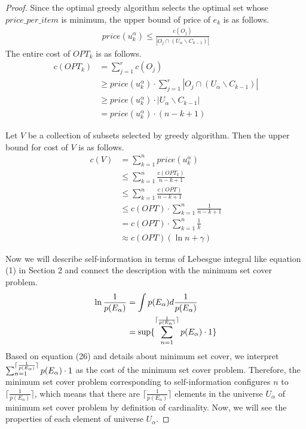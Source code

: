 \begin{proof}
Since the optimal greedy algorithm selects the optimal set whose $price\_per\_item$ is minimum,
the upper bound of price of $e_k$ is as follows.  
\begin{align}
\label{up_bound_price_per_item}
price(u^{\alpha}_k) \le \frac{c(O_j)}{|O_j \cap (U_{\alpha} \backslash C_{k-1})|} 
\end{align}
The entire cost of $OPT_k$ is as follows.
\begin{equation}
\label{low_bound_cost_optimum}
\begin{split}
c(OPT_k) &= \sum_{j=1}^rc(O_j)\\
         &\ge price(u^{\alpha}_k) \cdot \sum_{j=1}^r|O_j \cap (U_{\alpha}\backslash C_{k-1})|\\
         &\ge price(u^{\alpha}_k) \cdot |U_{\alpha} \backslash C_{k-1}|\\
         &= price(u^{\alpha}_k) \cdot (n-k+1)
\end{split}
\end{equation}

Let $V$ be a collection of subsets selected by greedy algorithm. 
Then the upper bound for cost of $V$ is as follows.
\begin{equation}
\label{up_bound_cost}
\begin{split}
c(V) &= \sum_{k=1}^n price(u^{\alpha}_k) \\
     &\le \sum_{k=1}^n\frac{c(OPT_k)}{n-k+1} \\
     &\le \sum_{k=1}^n\frac{c(OPT)}{n-k+1} \\
     &\le c(OPT) \cdot \sum_{k=1}^n \frac{1}{n-k+1} \\
     &= c(OPT) \cdot \sum_{k=1}^n \frac{1}{k} \\
     &\approx c(OPT)(\ln n + \gamma)
\end{split}
\end{equation} 

Now we will describe self-information in terms of Lebesgue integral like equation (1) in Section 2 
and connect the description with the minimum set cover problem.
\begin{align}
\label{lebesgue_integral_entropy}
\begin{split}
\ln {1 \over p(E_\alpha)} &=\int p(E_\alpha)d{1 \over p(E_\alpha)}\\
                          &=\sup\{\sum_{n=1}^{\lceil{1 \over p(E_{\alpha})}\rceil}p(E_{\alpha}) \cdot 1\}\\  
\end{split}
\end{align}
Based on equation (26) and details about minimum set cover, 
we interpret $\sum_{n=1}^{\lceil{1 \over p(E_\alpha)}\rceil}p(E_\alpha)\cdot 1$ as the cost of the minimum set cover problem.
Therefore, the minimum set cover problem corresponding to self-information configures $n$ to $\lceil\frac{1}{p(E_{\alpha})}\rceil$, 
which means that there are $\lceil\frac{1}{p(E_{\alpha})}\rceil$ elements in the universe $U_{\alpha}$ 
of minimum set cover problem by definition of cardinality.
Now, we will see the properties of each element of universe $U_{\alpha}$.


\end{proof}
